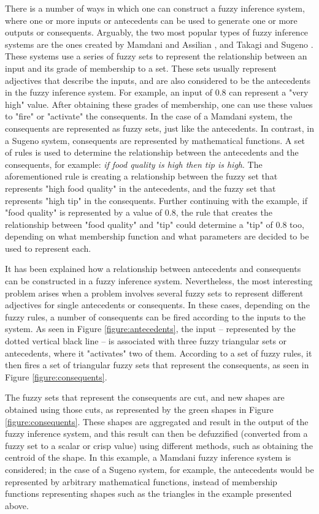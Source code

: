 There is a number of ways in which one can construct a fuzzy inference system,
where one or more inputs or antecedents can be used to generate one or more
outputs or consequents. Arguably, the two most popular types of fuzzy inference
systems are the ones created by Mamdani and Assilian \cite{Mamdani1975}, and
Takagi and Sugeno \cite{Takagi1985}. These systems use a series of fuzzy sets to
represent the relationship between an input and its grade of membership to a
set. These sets usually represent adjectives that describe the inputs, and are
also considered to be the antecedents in the fuzzy inference system. For
example, an input of 0.8 can represent a "very high" value. After obtaining
these grades of membership, one can use these values to "fire" or "activate" the
consequents. In the case of a Mamdani system, the consequents are represented as
fuzzy sets, just like the antecedents. In contrast, in a Sugeno system,
consequents are represented by mathematical functions. A set of rules is used to
determine the relationship between the antecedents and the consequents, for
example: \textit{if food quality is high then tip is high}. The aforementioned
rule is creating a relationship between the fuzzy set that represents "high food
quality" in the antecedents, and the fuzzy set that represents "high tip" in the
consequents. Further continuing with the example, if "food quality" is
represented by a value of 0.8, the rule that creates the relationship between
"food quality" and "tip" could determine a "tip" of 0.8 too, depending on what
membership function and what parameters are decided to be used to represent
each.

It has been explained how a relationship between antecedents and consequents can
be constructed in a fuzzy inference system. Nevertheless, the most interesting
problem arises when a problem involves several fuzzy sets to represent different
adjectives for single antecedents or consequents. In these cases, depending on
the fuzzy rules, a number of consequents can be fired according to the inputs to
the system. As seen in Figure \ref{figure:antecedents}, the input -- represented
by the dotted vertical black line -- is associated with three fuzzy triangular
sets or antecedents, where it "activates" two of them. According to a set of
fuzzy rules, it then fires a set of triangular fuzzy sets that represent the
consequents, as seen in Figure \ref{figure:consequents}.

The fuzzy sets that represent the consequents are cut, and new shapes are
obtained using those cuts, as represented by the green shapes in Figure
\ref{figure:consequents}. These shapes are aggregated and result in the output
of the fuzzy inference system, and this result can then be defuzzified
(converted from a fuzzy set to a scalar or crisp value) using different methods,
such as obtaining the centroid of the shape. In this example, a Mamdani fuzzy
inference system is considered; in the case of a Sugeno system, for example, the
antecedents would be represented by arbitrary mathematical functions, instead of
membership functions representing shapes such as the triangles in the example
presented above.

